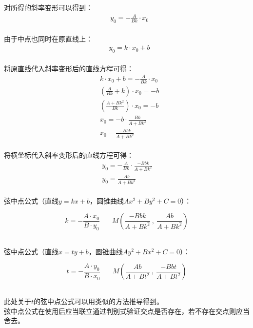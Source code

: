 \documentclass[UTF8]{ctexart}
\begin{document}
\newpage

    对所得的斜率变形可以得到：
    \begin{align}
        &y_0=-\frac{A}{Bk}\cdot x_0
    \end{align}\\
    由于中点也同时在原直线上：
    \begin{align}
        &y_0=k\cdot x_0+b
    \end{align}\\
    将原直线代入斜率变形后的直线方程可得：
    \begin{align}
        &k\cdot x_0+b=-\frac{A}{Bk}\cdot x_0\\[3mm]
        &\left(\frac{A}{Bk}+k\right)\cdot x_0=-b\\[3mm]
        &\left(\frac{A+Bk^2}{Bk}\right)\cdot x_0=-b\\[3mm]
        &x_0=-b\cdot\frac{Bk}{A+Bk^2}\\[3mm]
        &x_0=\frac{-Bbk}{A+Bk^2}
    \end{align}\\
    将横坐标代入斜率变形后的直线方程可得：
    \begin{align}
        &y_0=-\frac{A}{Bk}\cdot\frac{-Bbk}{A+Bk^2}~~~\\[3mm]
        &y_0=\frac{Ab}{A+Bk^2}
    \end{align}\\
    弦中点公式（直线$y=kx+b$，圆锥曲线$Ax^2+By^2+C=0$）：
    \begin{large}
        \begin{equation*}
            k=-\frac{A\cdot x_0}{B\cdot y_0}~~~~~~~~M\left(\frac{-Bbk}{A+Bk^2}~,~\frac{Ab}{A+Bk^2}\right)
        \end{equation*}
    \end{large}\\
    弦中点公式（直线$x=ty+b$，圆锥曲线$Ay^2+Bx^2+C=0$）：
    \begin{large}
        \begin{equation*}
            t=-\frac{A\cdot y_0}{B\cdot x_0}~~~~~~~~M\left(\frac{Ab}{A+Bt^2}~,~\frac{-Bbt}{A+Bt^2}\right)
        \end{equation*}
    \end{large}\\
    此处关于$t$的弦中点公式可以用类似的方法推导得到。\\[3mm]
    弦中点公式在使用后应当联立通过判别式验证交点是否存在，若不存在交点则应当舍去。

\newpage
\end{document}
